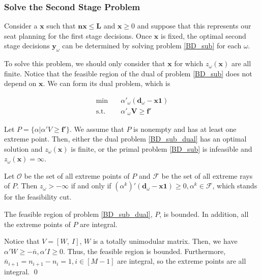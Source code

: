 \subsubsection{Solve the Second Stage Problem}\label{second_stage}

Consider a $\mathbf{x}$ such that $\mathbf{n x} \leq \mathbf{L}$ and $\mathbf{x} \geq 0$ and suppose that this represents our seat planning for the first stage decisions. Once $\mathbf{x}$ is fixed, the optimal second stage decisions $\mathbf{y}_{\omega}$ can be determined by solving problem \eqref{BD_sub} for each $\omega$.

To solve this problem, we should only consider that $\mathbf{x}$ for which $z_{\omega}(\mathbf{x})$ are all finite. Notice that the feasible region of the dual of problem \eqref{BD_sub} does not depend on $\mathbf{x}$. We can form its dual problem, which is 

\begin{equation}\label{BD_sub_dual}
  \begin{aligned}
    \min \quad & \alpha{'}_{\omega} (\mathbf{d}_{\omega}- \mathbf{x} \mathbf{1}) \\
    \text {s.t.} \quad & \alpha{'}_{\omega} \mathbf{V} \geq \mathbf{f}{'}
  \end{aligned}
  \end{equation}

Let $P = \{\alpha|\alpha{'}V \geq \mathbf{f}{'}\}$. 
We assume that $P$ is nonempty and has at least one extreme point. Then, either the dual problem \eqref{BD_sub_dual} has an optimal solution and $z_{\omega}(\mathbf{x})$ is finite, or the primal problem \eqref{BD_sub} is infeasible and $z_{\omega}(\mathbf{x}) = \infty$.  

Let $\mathcal{O}$ be the set of all extreme points of $P$ and $\mathcal{F}$ be the set of all extreme rays of $P$. Then $z_{\omega} > -\infty$ if and only if $(\alpha^{k}){'}(\mathbf{d}_{\omega}- \mathbf{x} \mathbf{1}) \geq 0, \alpha^{k} \in \mathcal{F}$, which stands for the feasibility cut. 

\begin{lem}\label{feasible_region}
  The feasible region of problem \eqref{BD_sub_dual}, $P$, is bounded. In addition, all the extreme points of $P$ are integral.
\end{lem}

\begin{pf}
Notice that $V =[W,~I]$, $W$ is a totally unimodular matrix. Then, we have $\alpha{'}W \geq -\bar{n}, \alpha{'}I \geq 0$. Thus, the feasible region is bounded.
Furthermore, $\bar{n}_{i+1} = n_{i+1} - n_{i} = 1, i \in [M-1]$ are integral, so the extreme points are all integral.
\qed
\end{pf}

